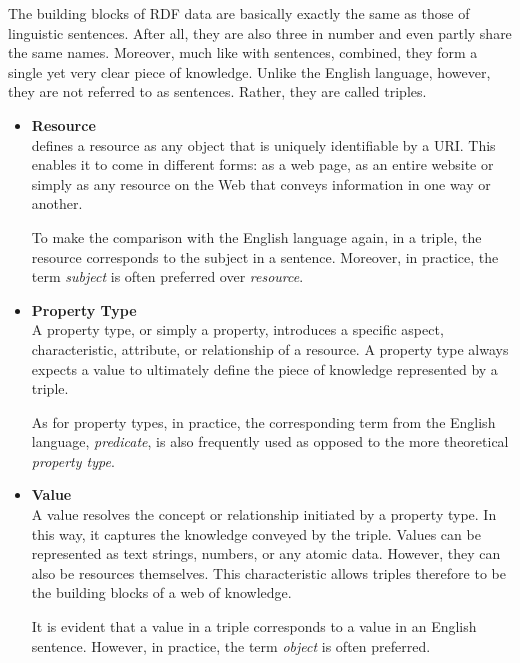 The building blocks of RDF data are basically exactly the same as those of linguistic sentences. After all, they are also three in number and even partly share the same names. Moreover, much like with sentences, combined, they form a single yet very clear piece of knowledge. Unlike the English language, however, they are not referred to as sentences. Rather, they are called triples. \citep{powers2003practical}
\begin{itemize}

    \item \textbf{Resource}\\
    \cite{miller1998introduction} defines a resource as any object that is uniquely identifiable by a URI. This enables it to come in different forms: as a web page, as an entire website or simply as any resource on the Web that conveys information in one way or another. \citep{candan2001resource}
    
    To make the comparison with the English language again, in a triple, the resource corresponds to the subject in a sentence. Moreover, in practice, the term \textit{subject} is often preferred over \textit{resource}. \citep{powers2003practical}

    \item \textbf{Property Type}\\
    A property type, or simply a property, introduces a specific aspect, characteristic, attribute, or relationship of a resource. A property type always expects a value to ultimately define the piece of knowledge represented by a triple. \citep{candan2001resource} \citep{miller1998introduction}
    
    As for property types, in practice, the corresponding term from the English language, \textit{predicate}, is also frequently used as opposed to the more theoretical \textit{property type}. \citep{powers2003practical}

    \item \textbf{Value}\\
    A value resolves the concept or relationship initiated by a property type. In this way, it captures the knowledge conveyed by the triple. Values can be represented as text strings, numbers, or any atomic data. However, they can also be resources themselves. This characteristic allows triples therefore to be the building blocks of a web of knowledge. \citep{miller1998introduction}
    
    It is evident that a value in a triple corresponds to a value in an English sentence. However, in practice, the term \textit{object} is often preferred. \citep{powers2003practical}
    
\end{itemize}

